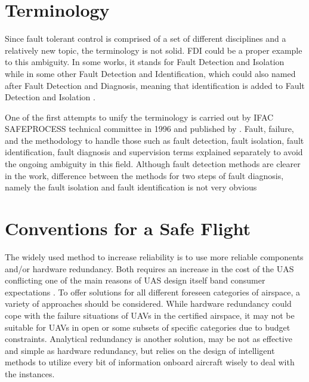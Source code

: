 \section{Terminology}\label{ch1:opts}

Since fault tolerant control is comprised of a set of different disciplines and a relatively 
new topic, the terminology is not solid. FDI could be a proper example to this ambiguity. 
In some works, it stands for Fault Detection and Isolation while in some other 
Fault Detection and Identification, which could also named after Fault Detection and Diagnosis, 
meaning that identification is added to Fault Detection and Isolation \cite{zhang2008bibliographical}.

One of the first attempts to unify the terminology is carried out by IFAC SAFEPROCESS 
technical committee in 1996 and published by \cite{isermann1997trends}. Fault, failure, 
and the methodology to handle those such as fault detection, fault isolation, fault identification, 
fault diagnosis and supervision terms explained separately to avoid the ongoing ambiguity 
in this field. Although fault detection methods are clearer in the work, difference between 
the methods for two steps of fault diagnosis, namely the fault isolation and fault 
identification is not very obvious

\section{Conventions for a Safe Flight}\label{ch1:conventions}

The widely used method to increase reliability is to use more reliable components 
and/or hardware redundancy. Both requires an increase in the cost of the UAS 
conflicting one of the main reasons of UAS design itself band consumer expectations 
\cite{angelov2012sense}. To offer solutions for all different foreseen categories of 
airspace, a variety of approaches should be considered. While hardware redundancy 
could cope with the failure situations of UAVs in the certified airspace, it may not be 
suitable for UAVs in open or some subsets of specific categories due to budget 
constraints. Analytical redundancy is another solution, may be not as effective and 
simple as hardware redundancy, but relies on the design of intelligent methods to 
utilize every bit of information onboard aircraft wisely to deal with the instances.  

